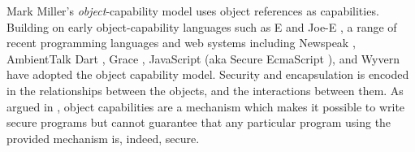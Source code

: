 Mark Miller's \cite{MillerPhD}
\textit{object}-capability model uses
object references
as capabilities. 
Building on early object-capability languages such as E
\cite{MillerPhD,ELang} and Joe-E \cite{JoeE}, 
a range of recent programming languages and web systems
\cite{CapJavaHayesAPLAS17,CapNetSocc17Eide,DOCaT14} including Newspeak
\cite{newspeak17},
AmbientTalk \cite{ambientTalk}
Dart \cite{dart15}, Grace \cite{grace,graceClasses},
JavaScript (aka Secure EcmaScript \cite{miller-esop2013}),
and Wyvern \cite{wyverncapabilities} have adopted the object
capability model.
Security  and encapsulation 
is encoded in the relationships between the objects, and the interactions between them.
 As argued in  \citet{capeFTfJP}, %
object capabilities are a mechanism which makes it possible to write secure
  programs
  but cannot guarantee that any particular program
  using the provided mechanism is, indeed,  secure.
%










